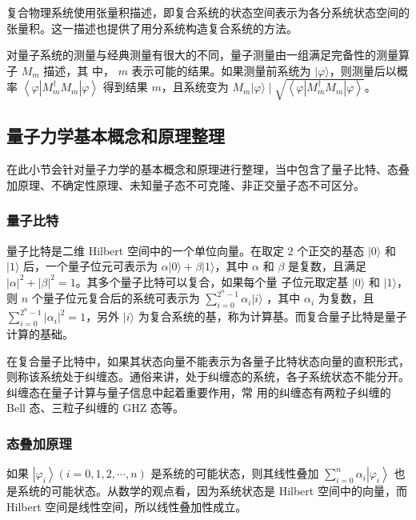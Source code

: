 复合物理系统使用张量积描述，即复合系统的状态空间表示为各分系统状态空间的张量积。这一描述也提供了用分系统构造复合系统的方法。

对量子系统的测量与经典测量有很大的不同，量子测量由一组满足完备性的测量算子 ${M_{m}}$ 描述，其 中， $m$ 表示可能的结果。如果测量前系统为 $|\varphi\rangle$，则测量后以概率 $\left\langle\varphi\left|M_{m}^{\dagger} M_{m}\right| \varphi\right\rangle$ 得到结果 $m$，且系统变为 $M_{m}|\varphi\rangle \mid \sqrt{\left\langle\varphi\left|M_{m}^{\dagger} M_{m}\right| \varphi\right\rangle}$。

\subsection{量子力学基本概念和原理整理}

在此小节会针对量子力学的基本概念和原理进行整理，当中包含了量子比特、态叠加原理、不确定性原理、未知量子态不可克隆、非正交量子态不可区分。

\subsubsection{量子比特}

量子比特是二维 Hilbert 空间中的一个单位向量。在取定 $2$ 个正交的基态 $|0\rangle$ 和 $|1\rangle$ 后，一个量子位元可表示为 $\alpha|0\rangle+\beta|1\rangle$，其中 $\alpha$ 和 $\beta$ 是复数，且满足 $|\alpha|^{2}+|\beta|^{2}=1$。其多个量子比特可以复合，如果每个量
子位元取定基 $|0\rangle$ 和 $|1\rangle$，则 $n$ 个量子位元复合后的系统可表示为 $\sum_{i=0}^{2^{n}-1} \alpha_{i}|i\rangle$ ，其中 $\alpha_{i}$ 为复数，且 $\sum_{i=0}^{2^{n}-1}\left|\alpha_{i}\right|^{2}=1$，另外 $|i\rangle$ 为复合系统的基，称为计算基。而复合量子比特是量子计算的基础。

在复合量子比特中，如果其状态向量不能表示为各量子比特状态向量的直积形式，则称该系统处于纠缠态。通俗来讲，处于纠缠态的系统，各子系统状态不能分开。纠缠态在量子计算与量子信息中起着重要作用，常 用的纠缠态有两粒子纠缠的 Bell 态、三粒子纠缠的 GHZ 态等。

\subsubsection{态叠加原理}

如果 $\left|\varphi_{i}\right\rangle(i=0,1,2, \cdots, n)$ 是系统的可能状态，则其线性叠加 $\sum_{i=0}^{n} \alpha_{i}\left|\varphi_{i}\right\rangle$ 也是系统的可能状态。从数学的观点看，因为系统状态是 Hilbert 空间中的向量，而 Hilbert 空间是线性空间，所以线性叠加性成立。

